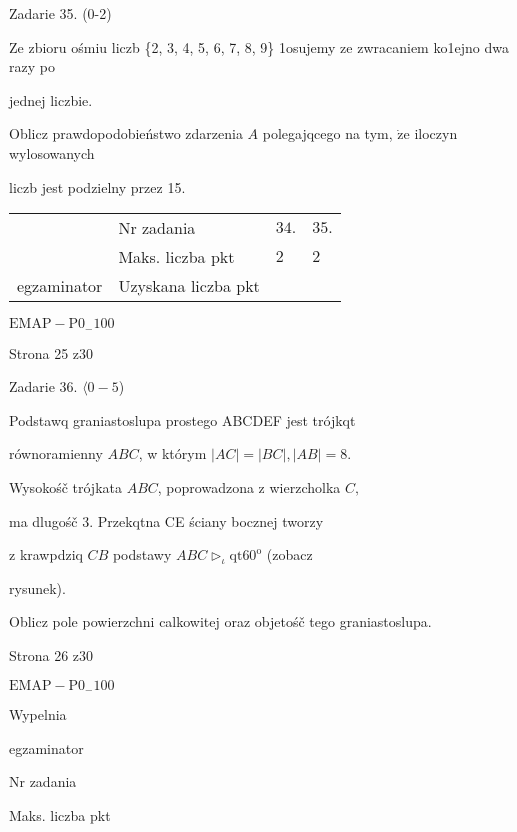 \documentclass[a4paper,12pt]{article}
\begin{document}
Zadarie 35. (0-2)

Ze zbioru ośmiu liczb \{2, 3, 4, 5, 6, 7, 8, 9\} 1osujemy ze zwracaniem ko1ejno dwa razy po

jednej liczbie.

Oblicz prawdopodobieństwo zdarzenia $A$ polegajqcego na tym, $\dot{\mathrm{z}}\mathrm{e}$ iloczyn wylosowanych

liczb jest podzielny przez 15.
\begin{center}
\begin{tabular}{|l|l|l|l|}
\cline{2-4}
&	\multicolumn{1}{|l|}{Nr zadania}&	\multicolumn{1}{|l|}{$34.$}&	\multicolumn{1}{|l|}{ $35.$}	\\
\cline{2-4}
&	\multicolumn{1}{|l|}{Maks. liczba pkt}&	\multicolumn{1}{|l|}{$2$}&	\multicolumn{1}{|l|}{ $2$}	\\
\cline{2-4}
\multicolumn{1}{|l|}{egzaminator}&	\multicolumn{1}{|l|}{Uzyskana liczba pkt}&	\multicolumn{1}{|l|}{}&	\multicolumn{1}{|l|}{}	\\
\hline
\end{tabular}

\end{center}
$\mathrm{E}\mathrm{M}\mathrm{A}\mathrm{P}-\mathrm{P}0_{-}100$

Strona 25 z30





Zadarie 36. $\langle 0-5$)

Podstawq graniastoslupa prostego ABCDEF jest trójkqt

równoramienny $ABC$, w którym $|AC|=|BC|, |AB|=8.$

Wysokośč trójkata $ABC$, poprowadzona z wierzcholka $C,$

ma dlugośč 3. Przekqtna CE ściany bocznej tworzy

z krawpdziq $CB$ podstawy $ABC \triangleright_{\iota}\mathrm{q}\mathrm{t} 60^{\mathrm{o}}$ (zobacz

rysunek).

Oblicz pole powierzchni calkowitej oraz objetośč tego graniastoslupa.

Strona 26 z30

$\mathrm{E}\mathrm{M}\mathrm{A}\mathrm{P}-\mathrm{P}0_{-}100$





Wypelnia

egzaminator

Nr zadania

Maks. liczba pkt
\end{document}
